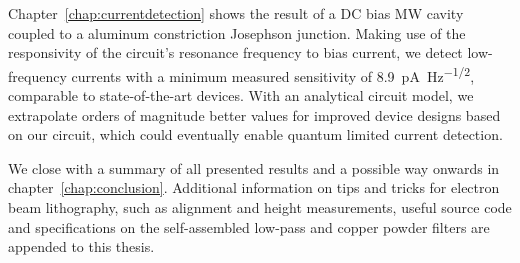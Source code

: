 Chapter~\ref{chap:currentdetection} shows the result of a DC bias MW cavity coupled to a aluminum constriction Josephson junction.
%
Making use of the responsivity of the circuit's resonance frequency to bias current, we detect low-frequency currents with a minimum measured sensitivity of \SI{8.9}{\pico\ampere\per\hertz\tothe{1/2}}, comparable to state-of-the-art devices.
%
With an analytical circuit model, we extrapolate orders of magnitude better values for improved device designs based on our circuit, which could eventually enable quantum limited current detection.


We close with a summary of all presented results and a possible way onwards in chapter~\ref{chap:conclusion}.
%
Additional information on tips and tricks for electron beam lithography, such as alignment and height measurements, useful source code and specifications on the self-assembled low-pass and copper powder filters are appended to this thesis.



